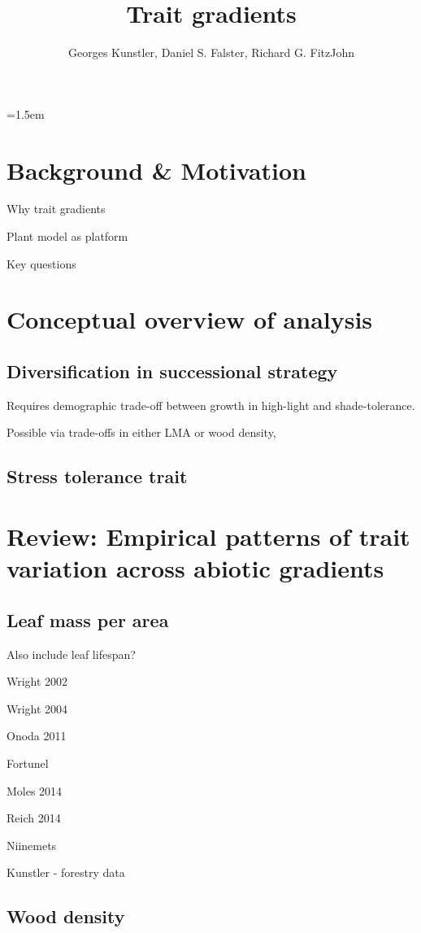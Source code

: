\documentclass[a4paper,11pt]{article}
\title{Trait gradients}
\author{ Georges Kunstler, Daniel S. Falster, Richard G. FitzJohn}
\date{}
\affiliation{Department of Biological Sciences, Macquarie University,
  Sydney, Australia}
\begin{document}
\mstitleshort
\parindent=1.5em
\addtolength{\parskip}{.3em}


\section{Background \& Motivation}

Why trait gradients

Plant model as platform \citep{Falster-2016}

Key questions

\section{Conceptual overview of analysis}

\subsection{Diversification in successional strategy}

Requires demographic trade-off between growth in high-light and shade-tolerance.

Possible via trade-offs in either LMA or wood density,

\subsection{Stress tolerance trait}


\section{Review: Empirical patterns of trait variation across abiotic
gradients}


\subsection{Leaf mass per area}

Also include leaf lifespan?


Wright 2002

Wright 2004

Onoda 2011

Fortunel

Moles 2014

Reich 2014

Niinemets


Kunstler - forestry data


\subsection{Wood density}


\clearpage



\end{document}
